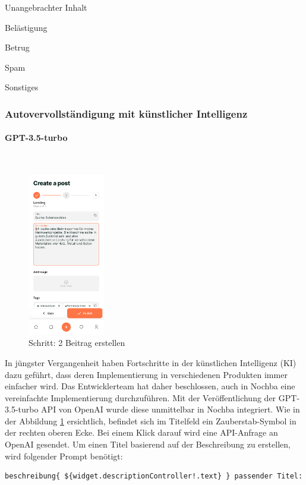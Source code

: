 \begin{compactitem}
  \item Unangebrachter Inhalt
  \item Belästigung
  \item Betrug
  \item Spam
  \item Sonstiges
\end{compactitem}

\subsubsection{Autovervollständigung mit künstlicher Intelligenz}
\paragraph{GPT-3.5-turbo}\mbox{} \\


\begin{figure}[H]
  \centering
  \includegraphics[width=0.3\textwidth]{pics/create-post.png}
  \caption{Schritt: 2 Beitrag erstellen}
  \label{fig:createpost}
\end{figure}


In jüngster Vergangenheit haben Fortschritte in der künstlichen Intelligenz (KI) dazu geführt, dass deren Implementierung in verschiedenen Produkten immer einfacher wird. Das Entwicklerteam hat daher beschlossen, auch in Nochba eine vereinfachte Implementierung durchzuführen. Mit der Veröffentlichung der GPT-3.5-turbo API von OpenAI wurde diese unmittelbar in Nochba integriert. Wie in der Abbildung \ref{fig:createpost} ersichtlich, befindet sich im Titelfeld ein Zauberstab-Symbol in der rechten oberen Ecke. Bei einem Klick darauf wird eine API-Anfrage an OpenAI gesendet. Um einen Titel basierend auf der Beschreibung zu erstellen, wird folgender Prompt benötigt:
\begin{verbatim}
beschreibung{ ${widget.descriptionController!.text} } passender Titel:
\end{verbatim}



